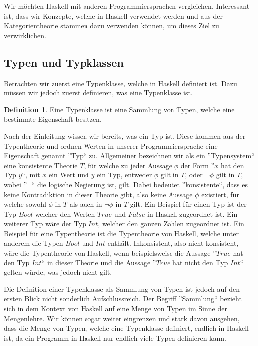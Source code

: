 \documentclass{hhuarticle}
\theoremstyle{definition}
\newtheorem{definition}{Definition}[section]
\theoremstyle{theorem}
\begin{document}
  Wir möchten Haskell mit anderen Programmiersprachen vergleichen.
  Interessant ist, dass wir Konzepte, welche in Haskell verwendet werden
  und aus der Kategorientheorie stammen dazu verwenden können, um dieses
  Ziel zu verwirklichen.

  \subsection{Typen und Typklassen}

  Betrachten wir zuerst eine Typenklasse, welche in Haskell definiert ist.
  Dazu müssen wir jedoch zuerst definieren, was eine Typenklasse ist.

  \begin{definition}
    Eine Typenklasse ist eine Sammlung von Typen, welche eine bestimmte
    Eigenschaft besitzen.
  \end{definition}

  Nach der Einleitung wissen wir bereits, was ein Typ ist. Diese kommen
  aus der Typentheorie und ordnen Werten in unserer Programmiersprache
  eine Eigenschaft genannt ''Typ`` zu. Allgemeiner bezeichnen wir als
  ein ''Typensystem`` eine konsistente Theorie $T$, für welche zu jeder Aussage $\phi$
  der Form ''$x$ hat den Typ $y$``, mit $x$ ein Wert und $y$ ein Typ,
  entweder $\phi$ gilt in $T$, oder $\neg \phi$ gilt in $T$, wobei ''$\neg$``
  die logische Negierung ist, gilt. Dabei bedeutet ''konsistente``, dass
  es keine Kontradiktion in dieser Theorie gibt, also keine Aussage $\phi$
  existiert, für welche sowohl $\phi$ in $T$ als auch in $\neg \phi$ in $T$ gilt.
  Ein Beispiel für einen Typ ist der Typ $Bool$ welcher
  den Werten $True$ und $False$ in Haskell zugeordnet ist. Ein weiterer Typ wäre
  der Typ $Int$, welcher den ganzen Zahlen zugeordnet ist.
  Ein Beispiel für eine Typentheorie ist die Typentheorie von Haskell,
  welche unter anderem die Typen $Bool$ und $Int$ enthält. Inkonsistent,
  also nicht konsistent, wäre die Typentheorie von Haskell, wenn
  beispielsweise die Aussage ''$True$ hat den Typ $Int$`` in dieser Theorie
  und die Aussage ''$True$ hat nicht den Typ $Int$`` gelten würde, was
  jedoch nicht gilt.

  Die Definition einer Typenklasse als Sammlung von Typen ist jedoch auf
  den ersten Blick nicht sonderlich Aufschlussreich. Der Begriff ''Sammlung``
  bezieht sich in dem Kontext von Haskell auf eine Menge von Typen im
  Sinne der Mengenlehre. Wir können sogar weiter eingrenzen und stark davon
  ausgehen, dass die Menge von Typen, welche eine Typenklasse definiert,
  endlich in Haskell ist, da ein Programm in Haskell nur endlich viele
  Typen definieren kann.
\end{document}
